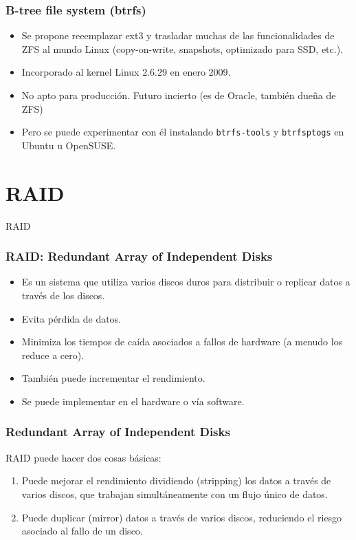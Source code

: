 \documentclass{beamer}
\begin{document}
\begin{frame}
  \frametitle{B-tree file system (btrfs)}
  \begin{itemize}
    \item Se propone reeemplazar ext3 y trasladar muchas de las funcionalidades de ZFS al mundo Linux (copy-on-write, snapshots, optimizado para SSD, etc.).
    \item Incorporado al kernel Linux 2.6.29 en enero 2009.
    \item  No apto para producción. Futuro incierto (es de Oracle, también dueña de ZFS)
    \item Pero se puede experimentar con él instalando \texttt{btrfs-tools} y \texttt{btrfsptogs} en Ubuntu u OpenSUSE. 
  \end{itemize}

\end{frame}



\section{RAID}

\begin{frame}
  \begin{center}
    \Huge{RAID}
  \end{center}
\end{frame}

\begin{frame}
  \frametitle{RAID: Redundant Array of Independent Disks}
  \begin{itemize}
    \item Es un sistema que utiliza varios discos duros para distribuir o replicar datos a través de los discos.
    \item Evita pérdida de datos.
    \item Minimiza los tiempos de caída asociados a fallos de hardware (a menudo los reduce a cero).
    \item También puede incrementar el rendimiento.
    \item Se puede implementar en el hardware o vía software.
  \end{itemize}
\end{frame}

\begin{frame}
  \frametitle{Redundant Array of Independent Disks}

RAID puede hacer dos cosas básicas:

  \begin{enumerate}
    \item Puede mejorar el rendimiento dividiendo (\alert{stripping}) los datos a través de varios discos, que trabajan simultáneamente con un flujo único de datos.
    \item Puede duplicar (\alert{mirror}) datos a través de varios discos, reduciendo el riesgo asociado al fallo de un disco.
  \end{enumerate}
\end{frame}
\end{document}
